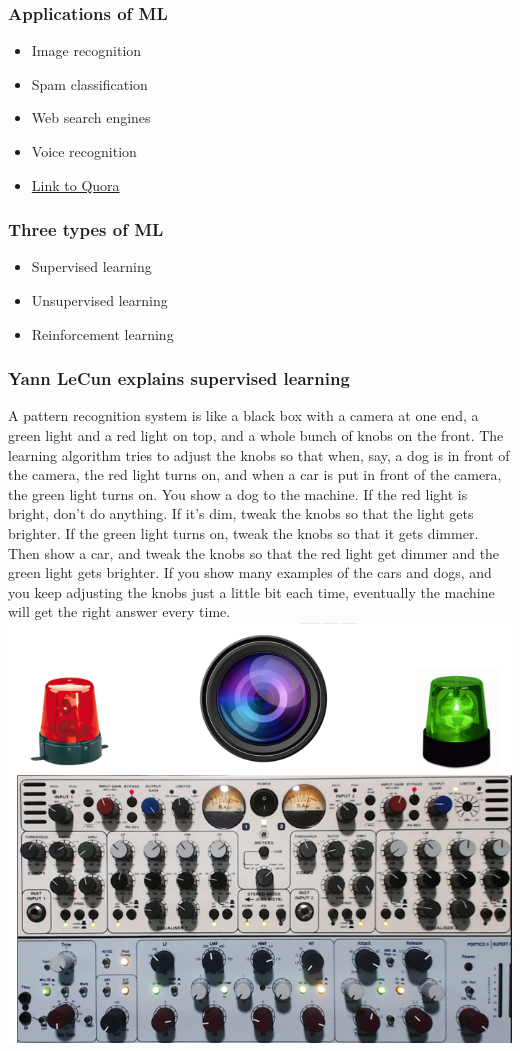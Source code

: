 \documentclass{beamer}
\begin{document}
\begin{frame}
  \frametitle{Applications of ML}
  \begin{itemize}
  \item Image recognition
  \item Spam classification
  \item Web search engines
  \item Voice recognition
  \item \href{https://www.quora.com/What-are-some-real-world-examples-of-applications-of-machine-learning-in-the-field}{Link to Quora}
  \end{itemize}
\end{frame}

\begin{frame}
  \frametitle{Three types of ML}
  \begin{itemize}
  \item Supervised learning
  \item Unsupervised learning
  \item Reinforcement learning
  \end{itemize}
\end{frame}

\begin{frame}
  \frametitle{Yann LeCun explains supervised learning}
  \scriptsize
  A pattern recognition system is like a black box with a camera at one end, a green light and a red light on top, and a whole bunch of knobs on the front. The learning algorithm tries to adjust the knobs so that when, say, a dog is in front of the camera, the red light turns on, and when a car is put in front of the camera, the green light turns on. You show a dog to the machine. If the red light is bright, don't do anything. If it’s dim, tweak the knobs so that the light gets brighter. If the green light turns on, tweak the knobs so that it gets dimmer. Then show a car, and tweak the knobs so that the red light get dimmer and the green light gets brighter. If you show many examples of the cars and dogs, and you keep adjusting the knobs just a little bit each time, eventually the machine will get the right answer every time.
  \center
  \includegraphics[scale=0.3]{Images/knobs.png}
\end{frame}
\end{document}
